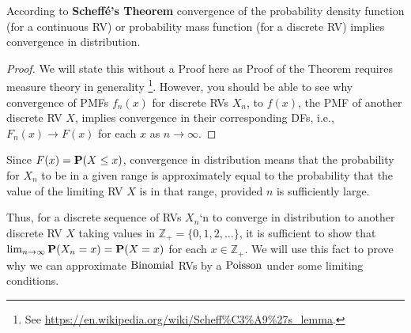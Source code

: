 \begin{prop}
According to {\bf Scheff\'e's Theorem} convergence of the probability density function (for a continuous RV) or probability mass function (for a discrete RV) implies convergence in distribution.
\begin{proof}
We will state this without a Proof here as Proof of the Theorem requires measure theory in generality \footnote{See \url{https://en.wikipedia.org/wiki/Scheff\%C3\%A9\%27s_lemma}.}. However, you should be able to see why convergence of PMFs $f_n(x)$ for discrete RVs $X_n$, to $f(x)$, the PMF of another discrete RV $X$, implies convergence in their corresponding DFs, i.e., $F_n(x) \to F(x)$ for each $x$ as $n \to \infty$. 
\end{proof}
\end{prop}

Since $F(x) = \mathbf{P}(X \leq x)$, convergence in distribution means that the probability for $X_n$ to be in a given range is approximately equal to the probability that the value of the limiting RV $X$ is in that range, provided $n$ is sufficiently large. 

Thus, for a discrete sequence of RVs $X_n$`n to converge in distribution to another discrete RV $X$ taking values in $\mathbb{Z}_+ = \{0,1,2,\ldots\}$, it is sufficient to show that $\lim_{n \to \infty}\mathbf{P}(X_n = x) = \mathbf{P}(X=x)$ for each $x \in \mathbb{Z_+}$.  
We will use this fact to prove why we can approximate $\mbox{{\rm Binomial}}$ RVs by a $\mbox{{\rm Poisson}}$ under some limiting conditions.

